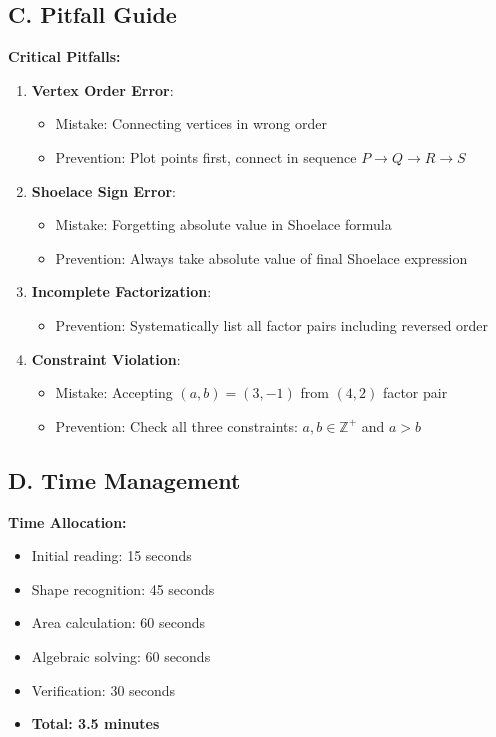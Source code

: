 \documentclass[]{article}
\begin{document}
\begin{solutionbox}
\subsection*{C. Pitfall Guide}

\textbf{Critical Pitfalls:}
\begin{enumerate}
    \item \textbf{Vertex Order Error}: 
    \begin{itemize}
        \item Mistake: Connecting vertices in wrong order
        \item Prevention: Plot points first, connect in sequence $P \to Q \to R \to S$
    \end{itemize}
    
    \item \textbf{Shoelace Sign Error}:
    \begin{itemize}
        \item Mistake: Forgetting absolute value in Shoelace formula
        \item Prevention: Always take absolute value of final Shoelace expression
    \end{itemize}
    
    \item \textbf{Incomplete Factorization}:
    \begin{itemize}
        \item Prevention: Systematically list all factor pairs including reversed order
    \end{itemize}
    
    \item \textbf{Constraint Violation}:
    \begin{itemize}
        \item Mistake: Accepting $(a,b) = (3,-1)$ from $(4,2)$ factor pair
        \item Prevention: Check all three constraints: $a,b \in \mathbb{Z}^+$ and $a>b$
    \end{itemize}
\end{enumerate}

\subsection*{D. Time Management}

\textbf{Time Allocation:}
\begin{itemize}[leftmargin=*]
    \item Initial reading: 15 seconds
    \item Shape recognition: 45 seconds
    \item Area calculation: 60 seconds  
    \item Algebraic solving: 60 seconds
    \item Verification: 30 seconds
    \item \textbf{Total: 3.5 minutes}
\end{itemize}


\end{solutionbox}
\end{document}
